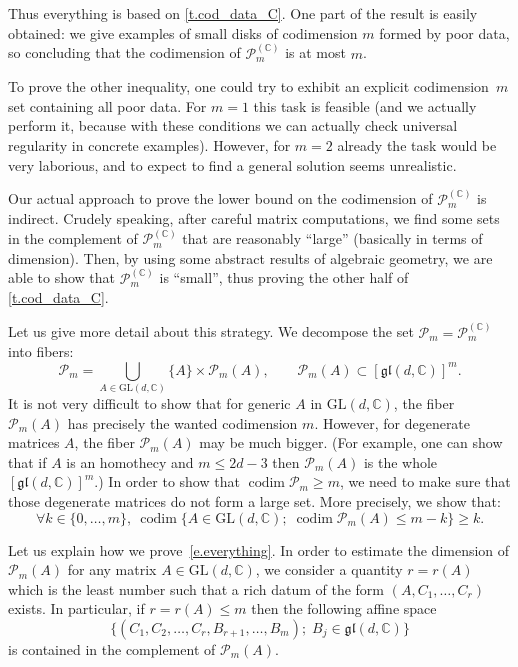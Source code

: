\documentclass[10pt, a4paper]{amsart}
\theoremstyle{plain}
\theoremstyle{definition}
\theoremstyle{remark}
\theoremstyle{note}
\numberwithin{equation}{section}
\begin{document}
Thus everything is based on \cref{t.cod_data_C}.
One part of the result is easily obtained:
we give examples of small disks of codimension $m$ formed by poor data,
so concluding that the codimension of ${\mathcal{P}}_{m}^{({\mathbb{C}})}$ is at most $m$.

To prove the other inequality, 
one could try to exhibit an explicit codimension~$m$ set containing all poor data.
For $m=1$ this task is feasible
(and we actually perform it, because with these conditions we can 
actually check universal regularity in concrete examples).
However, for $m=2$ already the task would be very laborious,
and to expect to find a general solution seems unrealistic.

Our actual approach to prove the lower bound on the codimension of ${\mathcal{P}}_{m}^{({\mathbb{C}})}$ is indirect.
Crudely speaking, after careful matrix computations,
we find some sets in the complement of ${\mathcal{P}}_{m}^{({\mathbb{C}})}$
that are reasonably ``large'' (basically in terms of dimension).
Then, by using some abstract results of algebraic geometry,
we are able to show that ${\mathcal{P}}_{m}^{({\mathbb{C}})}$ is ``small'', 
thus proving the other half of  \cref{t.cod_data_C}.

Let us give more detail about this strategy.
We decompose the set ${\mathcal{P}}_m = {\mathcal{P}}_{m}^{({\mathbb{C}})}$ into fibers: 
$$
{\mathcal{P}}_m =\bigcup_{A \in {\mathrm{GL}}(d,{\mathbb{C}})} \{A\} \times {\mathcal{P}}_m(A) , \qquad {\mathcal{P}}_m(A) \subset [{\mathfrak{gl}}(d,{\mathbb{C}})]^m.
$$
It is not very difficult to show that for generic $A$ in ${\mathrm{GL}}(d,{\mathbb{C}})$, 
the fiber ${\mathcal{P}}_m(A)$ has precisely the wanted codimension $m$.
However, for degenerate matrices $A$, the fiber ${\mathcal{P}}_m(A)$ may be much bigger.
(For example, one can show that if $A$ is an homothecy and $m \le 2d-3$ then ${\mathcal{P}}_m(A)$ is the whole $[{\mathfrak{gl}}(d,{\mathbb{C}})]^m$.)
In order to show that $\operatorname{codim} {\mathcal{P}}_m \ge m$, we need to make sure 
that those degenerate matrices do not form a large set.
More precisely, we show that:
\begin{equation}\label{e.everything}
\forall k\in\{0,\ldots,m\}, \ 
\operatorname{codim} \big\{ A \in {\mathrm{GL}}(d,{\mathbb{C}}) ; \;  \operatorname{codim} {\mathcal{P}}_m(A) \le m-k  \big\} \ge k. 
\end{equation}

Let us explain how we prove~\eqref{e.everything}.
In order to estimate the dimension of ${\mathcal{P}}_m(A)$ for any matrix $A \in {\mathrm{GL}}(d,{\mathbb{C}})$,
we consider a quantity $r = r(A)$ which is the least number such that
a rich datum of the form $(A,C_1,\ldots,C_r)$ exists.
In particular, if $r = r(A) \le m$ 
then the following affine space 
\begin{equation}\label{e.affine}
\big\{ (C_1, C_2, \dots, C_r , B_{r+1}, \dots, B_m ) ; \; B_j \in {\mathfrak{gl}}(d,{\mathbb{C}}) \big\}
\end{equation}
is contained in the complement of ${\mathcal{P}}_m(A)$.
\end{document}
